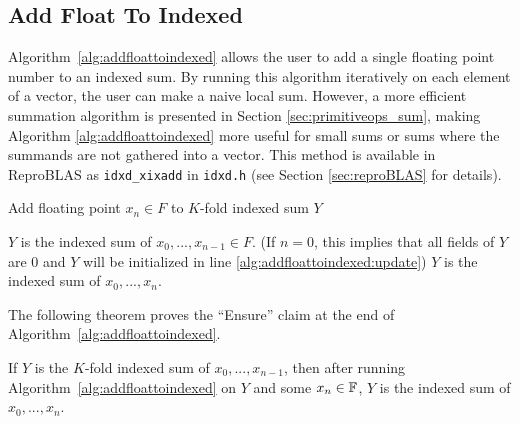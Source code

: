 \subsection{Add Float To Indexed}
  \label{sec:primitiveops_addfloattoindexed}
  Algorithm~\ref{alg:addfloattoindexed} allows the user to add a single floating
  point number to an indexed sum. By running this algorithm iteratively on each
  element of a vector, the user can make a naive local sum. However, a more
  efficient summation algorithm is presented in Section \ref{sec:primitiveops_sum}, making Algorithm \ref{alg:addfloattoindexed} more useful for small sums or sums where the summands are not gathered into a vector.
  This method is available in ReproBLAS as \texttt{idxd\_xixadd} in \texttt{idxd.h} (see Section \ref{sec:reproBLAS} for details).

  \begin{alg}
    Add floating point $x_n \in F$ to $K$-fold indexed sum $Y$
    \label{alg:addfloattoindexed}
    \begin{algorithmic}[1]
      \Require
        $Y$ is the indexed sum of $x_0, ..., x_{n - 1} \in F$. (If $n = 0$, this implies that all fields of $Y$ are 0 and $Y$ will be initialized in line \ref{alg:addfloattoindexed:update})
        \State {} \label{alg:addfloattoindexed:update}
        \State {}
        \State {}
      \EndFunction
      \Ensure
        $Y$ is the indexed sum of $x_0, ..., x_{n}$.
    \end{algorithmic}
  \end{alg}

  The following theorem proves the ``Ensure'' claim at the end of Algorithm~\ref{alg:addfloattoindexed}.
  \begin{thm}
    If $Y$ is the $K$-fold indexed sum of $x_0, ..., x_{n - 1}$, then after
    running Algorithm~\ref{alg:addfloattoindexed} on $Y$ and some $x_n \in \mathbb{F}$,
    $Y$ is the indexed sum of $x_0, ..., x_n$.
    \label{thm:addfloattoindexed}
  \end{thm}

